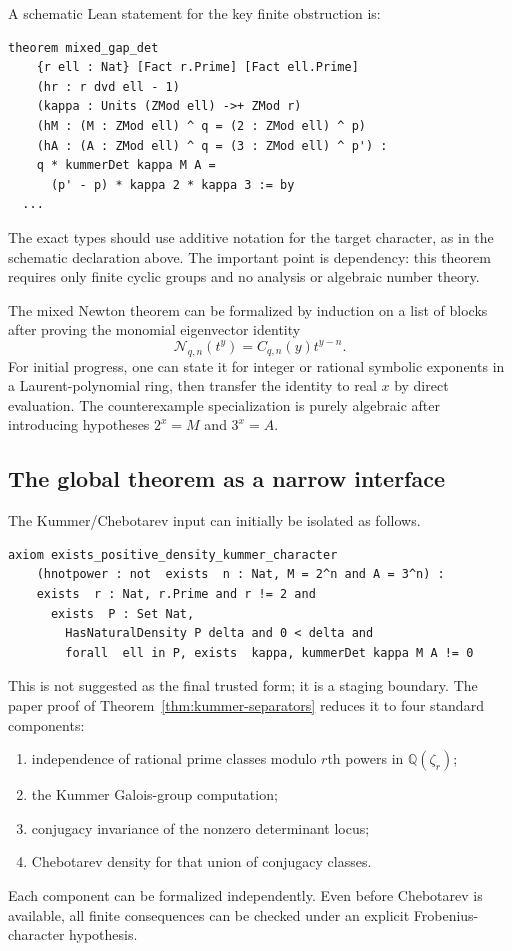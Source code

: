 \documentclass[11pt,oneside]{article}
\theoremstyle{definition}
\theoremstyle{remark}
\newcommand{\Q}{\mathbb Q}
\begin{document}
A schematic Lean statement for the key finite obstruction is:

\begin{lstlisting}[language={},basicstyle=\ttfamily\scriptsize,frame=single,backgroundcolor=\color{codegray}]
theorem mixed_gap_det
    {r ell : Nat} [Fact r.Prime] [Fact ell.Prime]
    (hr : r dvd ell - 1)
    (kappa : Units (ZMod ell) ->+ ZMod r)
    (hM : (M : ZMod ell) ^ q = (2 : ZMod ell) ^ p)
    (hA : (A : ZMod ell) ^ q = (3 : ZMod ell) ^ p') :
    q * kummerDet kappa M A =
      (p' - p) * kappa 2 * kappa 3 := by
  ...
\end{lstlisting}

The exact types should use additive notation for the target character, as in the
schematic declaration above.  The important point is dependency: this theorem requires
only finite cyclic groups and no analysis or algebraic number theory.

The mixed Newton theorem can be formalized by induction on a list of blocks after proving the
monomial eigenvector identity
\[
 \mathcal N_{q,n}(t^y)=C_{q,n}(y)t^{y-n}.
\]
For initial progress, one can state it for integer or rational symbolic exponents in a
Laurent-polynomial ring, then transfer the identity to real $x$ by direct evaluation.  The
counterexample specialization is purely algebraic after introducing hypotheses $2^x=M$ and
$3^x=A$.

\subsection{The global theorem as a narrow interface}

The Kummer/Chebotarev input can initially be isolated as follows.

\begin{lstlisting}[language={},basicstyle=\ttfamily\scriptsize,frame=single,backgroundcolor=\color{codegray}]
axiom exists_positive_density_kummer_character
    (hnotpower : not  exists  n : Nat, M = 2^n and A = 3^n) :
    exists  r : Nat, r.Prime and r != 2 and
      exists  P : Set Nat,
        HasNaturalDensity P delta and 0 < delta and
        forall  ell in P, exists  kappa, kummerDet kappa M A != 0
\end{lstlisting}

This is not suggested as the final trusted form; it is a staging boundary.  The paper proof of
Theorem~\ref{thm:kummer-separators} reduces it to four standard components:
\begin{enumerate}
\item independence of rational prime classes modulo $r$th powers in $\Q(\zeta_r)$;
\item the Kummer Galois-group computation;
\item conjugacy invariance of the nonzero determinant locus;
\item Chebotarev density for that union of conjugacy classes.
\end{enumerate}
Each component can be formalized independently.  Even before Chebotarev is available, all
finite consequences can be checked under an explicit Frobenius-character hypothesis.
\end{document}
